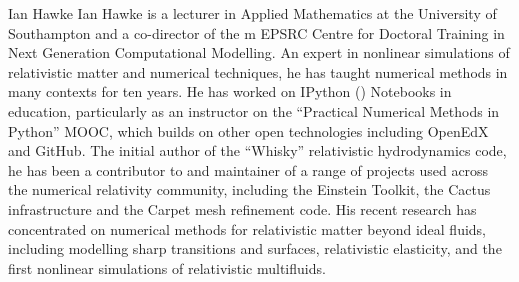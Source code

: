 \begin{participant}[PM=2,type=PI,gender=male]{Ian Hawke}
%
Ian Hawke is a lecturer in Applied Mathematics at the University of
Southampton and a co-director of the m EPSRC Centre for Doctoral
Training in Next Generation Computational Modelling. An expert in
nonlinear simulations of relativistic matter and numerical techniques,
he has taught numerical methods in many contexts for ten years. He has
worked on IPython (\Jupyter{}) Notebooks in education, particularly as an
instructor on the ``Practical Numerical Methods in Python'' MOOC,
which builds on other open technologies including OpenEdX and GitHub. The
initial author of the ``Whisky'' relativistic hydrodynamics code, he has
been a contributor to and maintainer of a range of projects used
across the numerical relativity community, including the Einstein
Toolkit, the Cactus infrastructure and the Carpet mesh refinement
code. His recent research has concentrated on numerical methods for
relativistic matter beyond ideal fluids, including modelling sharp
transitions and surfaces, relativistic elasticity, and the first
nonlinear simulations of relativistic multifluids.
%
\end{participant}


